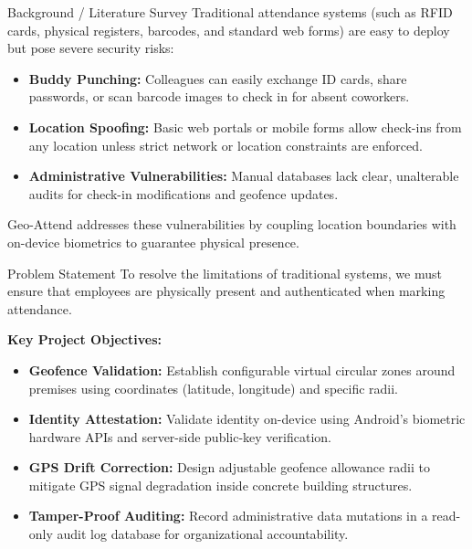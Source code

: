 \documentclass{beamer}
\begin{document}
\begin{frame}{Background / Literature Survey}
  Traditional attendance systems (such as RFID cards, physical registers, barcodes, and standard web forms) are easy to deploy but pose severe security risks:
  
  \begin{itemize}
    \item \textbf{Buddy Punching:} Colleagues can easily exchange ID cards, share passwords, or scan barcode images to check in for absent coworkers.
    \item \textbf{Location Spoofing:} Basic web portals or mobile forms allow check-ins from any location unless strict network or location constraints are enforced.
    \item \textbf{Administrative Vulnerabilities:} Manual databases lack clear, unalterable audits for check-in modifications and geofence updates.
  \end{itemize}
  Geo-Attend addresses these vulnerabilities by coupling location boundaries with on-device biometrics to guarantee physical presence.
\end{frame}

\begin{frame}{Problem Statement}
  To resolve the limitations of traditional systems, we must ensure that employees are physically present and authenticated when marking attendance.
  
  \vspace{6pt}
  \textbf{Key Project Objectives:}
  \begin{itemize}
      \item \textbf{Geofence Validation:} Establish configurable virtual circular zones around premises using coordinates (latitude, longitude) and specific radii.
      \item \textbf{Identity Attestation:} Validate identity on-device using Android's biometric hardware APIs and server-side public-key verification.
      \item \textbf{GPS Drift Correction:} Design adjustable geofence allowance radii to mitigate GPS signal degradation inside concrete building structures.
      \item \textbf{Tamper-Proof Auditing:} Record administrative data mutations in a read-only audit log database for organizational accountability.
  \end{itemize}
\end{frame}
\end{document}
